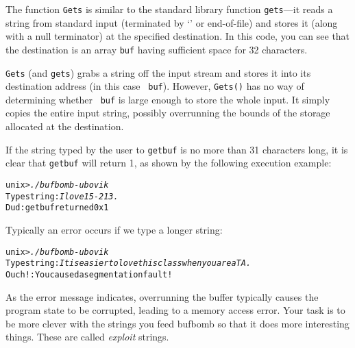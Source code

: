 \documentclass[11pt]{article}
\newenvironment{ccode}%
{\small}%
{}
\newenvironment{tty}%
{\small\begin{alltt}}%
{\end{alltt}}
\begin{document}
\begin{ccode}

\end{ccode}

The function {\tt Gets} is similar to the standard library function
{\tt gets}---it reads a string from standard input (terminated by
`\verb@\n@' or end-of-file) and stores it (along with a null
terminator) at the specified destination.  In this code, you can see
that the destination is an array {\tt buf} having sufficient space for
32 characters.

{\tt Gets} (and {\tt gets}) grabs a string off the input stream and
stores it into its destination address (in this case {\tt
buf}). However, {\tt Gets()} has no way of determining whether {\tt
buf} is large enough to store the whole input.  It simply copies the
entire input string, possibly overrunning the bounds of the storage
allocated at the destination.

If the string typed by the user to {\tt getbuf} is no more than 31
characters long, it is clear that {\tt getbuf} will return 1, as shown
by the following execution example:

\begin{tty}
    unix>{\em ./bufbomb -u bovik}
    Type string:{\em I love 15-213.}
    Dud: getbuf returned 0x1
\end{tty}

Typically an error occurs if we type a longer string:

\begin{tty}
    unix>{\em ./bufbomb -u bovik}
    Type string:{\em It is easier to love this class when you are a TA.}
    Ouch!: You caused a segmentation fault!
\end{tty}

As the error message indicates, overrunning the buffer typically
causes the program state to be corrupted, leading to a memory access
error.  Your task is to be more clever with the strings you feed {\sc
bufbomb} so that it does more interesting things.  These are called
{\em exploit} strings.
\end{document}
